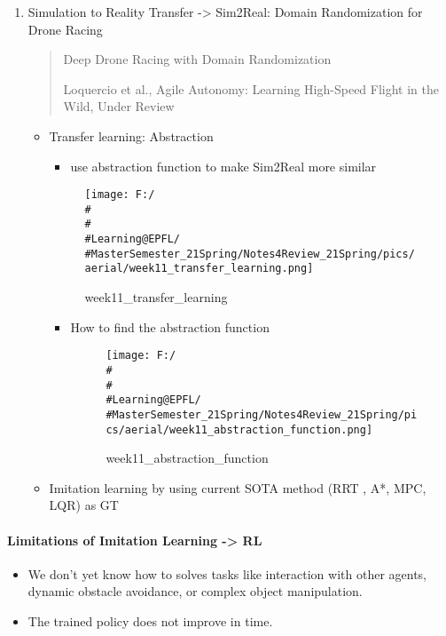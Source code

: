 \documentclass[]{article}
\let\oldparagraph\paragraph
\renewcommand{\paragraph}[1]{\oldparagraph{#1}\mbox{}}
\begin{document}
\begin{enumerate}
\def\labelenumi{\arabic{enumi}.}
\item
  Simulation to Reality Transfer -\textgreater{} Sim2Real: Domain
  Randomization for Drone Racing

  \begin{quote}
  Deep Drone Racing with Domain Randomization

  Loquercio et al., Agile Autonomy: Learning High-Speed Flight in the
  Wild, Under Review
  \end{quote}

  \begin{itemize}
  \item
    Transfer learning: Abstraction

    \begin{itemize}
    \item
      use abstraction function to make Sim2Real more similar
    \end{itemize}

    \begin{figure}
    \centering
    \texttt{[image: F:/\\\#\\\#\\\#Learning@EPFL/\\\#MasterSemester\_21Spring/Notes4Review\_21Spring/pics/aerial/week11\_transfer\_learning.png]}
    \caption{week11\_transfer\_learning}
    \end{figure}

    \begin{itemize}
    \item
      How to find the abstraction function

      \begin{figure}
      \centering
      \texttt{[image: F:/\\\#\\\#\\\#Learning@EPFL/\\\#MasterSemester\_21Spring/Notes4Review\_21Spring/pics/aerial/week11\_abstraction\_function.png]}
      \caption{week11\_abstraction\_function}
      \end{figure}
    \end{itemize}
  \item
    Imitation learning by using current SOTA method (RRT , A*, MPC, LQR)
    as GT
  \end{itemize}
\end{enumerate}

\paragraph{Limitations of Imitation Learning -\textgreater{}
RL}\label{header-n2767}

\begin{itemize}
\item
  We don't yet know how to solves tasks like interaction with other
  agents, dynamic obstacle avoidance, or complex object manipulation.
\item
  The trained policy does not improve in time.
\end{itemize}
\end{document}
